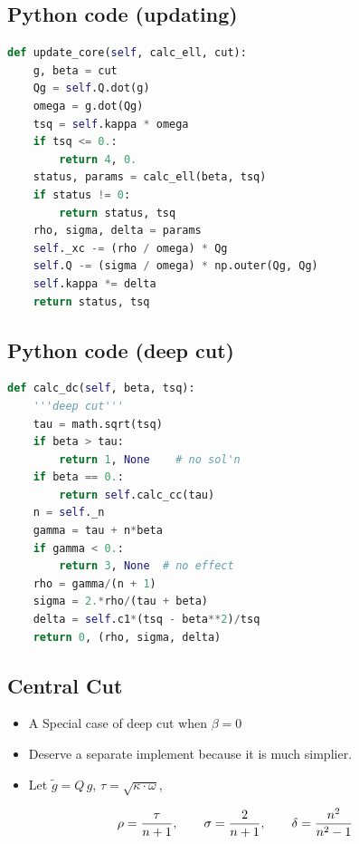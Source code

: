 \documentclass[]{article}
\providecommand{\tightlist}{%
  \setlength{\itemsep}{0pt}\setlength{\parskip}{0pt}}
\begin{document}
\hypertarget{python-code-updating}{%
\subsection{Python code (updating)}\label{python-code-updating}}

\begin{lstlisting}[language=Python]
def update_core(self, calc_ell, cut):
    g, beta = cut
    Qg = self.Q.dot(g)
    omega = g.dot(Qg)
    tsq = self.kappa * omega
    if tsq <= 0.:
        return 4, 0.
    status, params = calc_ell(beta, tsq)
    if status != 0:
        return status, tsq
    rho, sigma, delta = params
    self._xc -= (rho / omega) * Qg
    self.Q -= (sigma / omega) * np.outer(Qg, Qg)
    self.kappa *= delta
    return status, tsq
\end{lstlisting}

\hypertarget{python-code-deep-cut}{%
\subsection{Python code (deep cut)}\label{python-code-deep-cut}}

\begin{lstlisting}[language=Python]
def calc_dc(self, beta, tsq):
    '''deep cut'''
    tau = math.sqrt(tsq)
    if beta > tau:
        return 1, None    # no sol'n
    if beta == 0.:
        return self.calc_cc(tau)
    n = self._n
    gamma = tau + n*beta
    if gamma < 0.:
        return 3, None  # no effect
    rho = gamma/(n + 1)
    sigma = 2.*rho/(tau + beta)
    delta = self.c1*(tsq - beta**2)/tsq
    return 0, (rho, sigma, delta)
\end{lstlisting}

\hypertarget{central-cut}{%
\subsection{Central Cut}\label{central-cut}}

\begin{itemize}
\tightlist
\item
  A Special case of deep cut when \(\beta = 0\)
\item
  Deserve a separate implement because it is much simplier.
\item
  Let \(\tilde{g} = Q\,g\), \(\tau = \sqrt{\kappa\cdot\omega}\),
\end{itemize}

\[\rho = {\tau \over n+1}, \qquad
  \sigma = {2 \over n+1}, \qquad
  \delta = {n^2 \over n^2 - 1}\]
\end{document}
